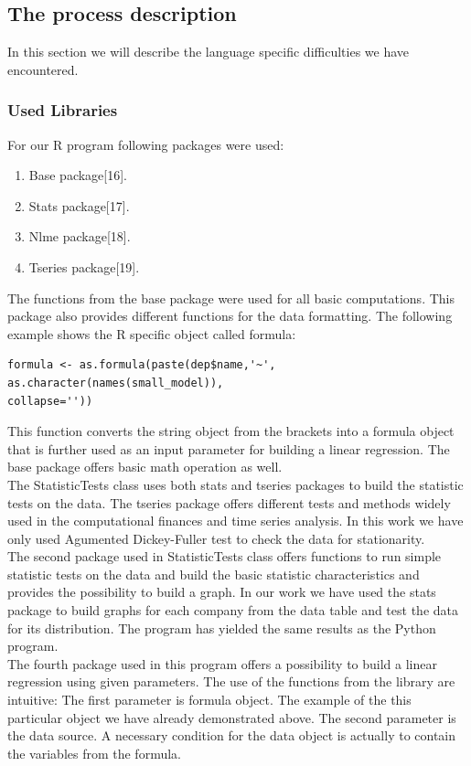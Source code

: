 \documentclass [twoside,
  11pt, a4paper,
  footinclude=true,
  headinclude=true,
  cleardoublepage=empty
]{article}
\begin{document}
\subsection{The process description}
In this section we will describe the language specific difficulties we have encountered.
\subsubsection{Used Libraries}
For our R program following packages were used:
\begin{enumerate}
    \item Base package[16].
    \item Stats package[17].
    \item Nlme package[18].
    \item Tseries package[19].
\end{enumerate}
The functions from the base package were used for all basic computations. This package also provides different functions for the data formatting. The following example shows the R specific object called formula:
\begin{verbatim}
formula <- as.formula(paste(dep$name,'~', as.character(names(small_model)),
collapse=''))
\end{verbatim}
This function converts the string object from the brackets into a formula object that is further used as an input parameter for building a linear regression. The base package offers basic math operation as well.\\
The StatisticTests class uses both stats and tseries packages to build the statistic tests on the data. The tseries package offers different tests and methods widely used in the computational finances and time series analysis. In this work we have only used Agumented Dickey-Fuller test to check the data for stationarity.\\
The second package used in StatisticTests class offers functions to run simple statistic tests on the data and build the basic statistic characteristics and provides the possibility to build a graph. In our work we have used the stats package to build graphs for each company from the data table and test the data for its distribution. The program has yielded the same results as the Python program.\\
The fourth package used in this program offers a possibility to build a linear regression using given parameters. The use of the functions from the library are intuitive:
The first parameter is formula object. The example of the this particular object we have already demonstrated above. The second parameter is the data source. A necessary condition for the data object is actually to contain the variables from the formula.\\
\end{document}
